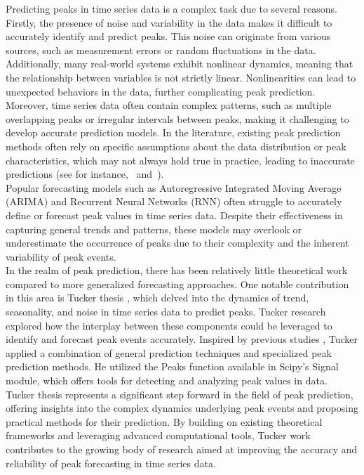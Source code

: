 \documentclass[12pt,a4paper]{article}
\begin{document}
	Predicting peaks in time series data is a complex task due to several reasons. Firstly, the presence of noise and variability in the data makes it difficult to accurately identify and predict peaks. This noise can originate from various sources, such as measurement errors or random fluctuations in the data. Additionally, many real-world systems exhibit nonlinear dynamics, meaning that the relationship between variables is not strictly linear. Nonlinearities can lead to unexpected behaviors in the data, further complicating peak prediction. Moreover, time series data often contain complex patterns, such as multiple overlapping peaks or irregular intervals between peaks, making it challenging to develop accurate prediction models. In the literature, existing peak prediction methods often rely on specific assumptions about the data distribution or peak characteristics, which may not always hold true in practice, leading to inaccurate predictions (see for instance,~\cite{See17} and~\cite{Tuc20}).\\
	
	Popular forecasting models such as Autoregressive Integrated Moving Average (ARIMA) and Recurrent Neural Networks (RNN) often struggle to accurately define or forecast peak values in time series data. Despite their effectiveness in capturing general trends and patterns, these models may overlook or underestimate the occurrence of peaks due to their complexity and the inherent variability of peak events.\\
	
	In the realm of peak prediction, there has been relatively little theoretical work compared to more generalized forecasting approaches. One notable contribution in this area is Tucker thesis \cite{Tuc20}, which delved into the dynamics of trend, seasonality, and noise in time series data to predict peaks. Tucker research explored how the interplay between these components could be leveraged to identify and forecast peak events accurately. Inspired by previous studies \cite{YuB2019}, Tucker applied a combination of general prediction techniques and specialized peak prediction methods. He utilized the Peaks function available in Scipy's Signal module, which offers tools for detecting and analyzing peak values in data. Tucker thesis represents a significant step forward in the field of peak prediction, offering insights into the complex dynamics underlying peak events and proposing practical methods for their prediction. By building on existing theoretical frameworks and leveraging advanced computational tools, Tucker work contributes to the growing body of research aimed at improving the accuracy and reliability of peak forecasting in time series data.\\
	
\end{document}
